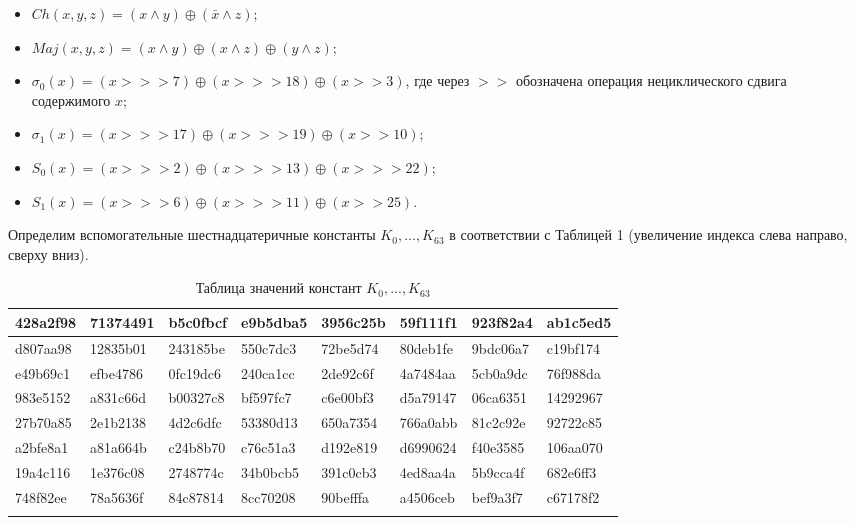 \documentclass{./civarticle}
\begin{document}
\begin{enumerate}
    \begin{itemize}
        \item $Ch(x, y, z) = (x \wedge y) \oplus (\bar x \wedge z)$;
        \item $Maj(x, y, z) = (x \wedge y) \oplus (x \wedge z) \oplus (y \wedge z)$;

        \item $\sigma_0(x) = (x >>> 7) \oplus (x >>> 18) \oplus (x >> 3)$, где через $>>$ обозначена операция нециклического сдвига содержимого $x$;

        \item $\sigma_1(x) = (x >>> 17) \oplus (x >>> 19) \oplus (x >> 10)$;

        \item $S_0(x) = (x >>> 2) \oplus (x >>> 13) \oplus (x >>> 22)$;

        \item $S_1(x) = (x >>> 6) \oplus (x >>> 11) \oplus (x >> 25)$.
        
    \end{itemize}

    Определим вспомогательные шестнадцатеричные константы $K_0, ..., K_{63}$ в соответствии с Таблицей 1 (увеличение индекса слева направо, сверху вниз).

    \begin{longtable}{|p{1.3cm}|p{1.3cm}|p{1.3cm}|p{1.3cm}|p{1.3cm}|p{1.3cm}|p{1.3cm}|p{1.3cm}|}
\hline
428a2f98 & 71374491 & b5c0fbcf & e9b5dba5 & 3956c25b & 59f111f1 & 923f82a4 & ab1c5ed5 \\
\hline
d807aa98 & 12835b01 & 243185be & 550c7dc3 & 72be5d74 & 80deb1fe & 9bdc06a7 & c19bf174  \\
\hline
e49b69c1 & efbe4786 & 0fc19dc6 & 240ca1cc & 2de92c6f & 4a7484aa & 5cb0a9dc & 76f988da \\
\hline
983e5152 & a831c66d & b00327c8 & bf597fc7 & c6e00bf3 & d5a79147 & 06ca6351 & 14292967 \\
\hline
27b70a85 & 2e1b2138 & 4d2c6dfc & 53380d13 & 650a7354 & 766a0abb & 81c2c92e & 92722c85 \\
\hline
a2bfe8a1 & a81a664b & c24b8b70 & c76c51a3 & d192e819 & d6990624 & f40e3585 & 106aa070 \\
\hline
19a4c116 & 1e376c08 & 2748774c & 34b0bcb5 & 391c0cb3 & 4ed8aa4a & 5b9cca4f & 682e6ff3 \\
\hline
748f82ee & 78a5636f & 84c87814 & 8cc70208 & 90befffa & a4506ceb & bef9a3f7 & c67178f2 \\
\hline
\caption{Таблица значений констант $K_0, ..., K_{63}$}
\end{longtable}


\end{enumerate}
\end{document}
